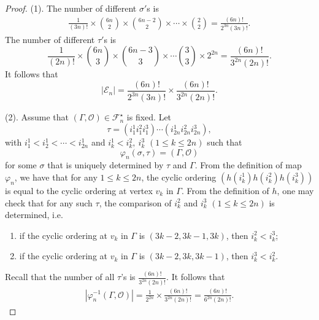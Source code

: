 \documentclass{amsart}
\theoremstyle{plain}
\theoremstyle{definition}
\theoremstyle{remark}
\begin{document}
\begin{proof}
(1). The number of different $\sigma'$s is
\begin{align*}
    \frac{1}{(3n)!}\times\binom{6n}{2}\times\binom{6n-2}{2}\times\cdots\times\binom{2}{2}=\frac{(6n)!}{2^{3n}(3n)!}.
\end{align*}
The number of different $\tau'$s is
$$\frac{1}{(2n)!}\times\binom{6n}{3}\times\binom{6n-3}{3}\times\cdots\binom{3}{3}\times 2^{2n}=\frac{(6n)!}{3^{2n}(2n)!}.$$
It follows that 
$$|\mathcal{E}_n|=\frac{(6n)!}{2^{3n}(3n)!}\times \frac{(6n)!}{3^{2n} (2n)!}.$$

(2). Assume that $(\Gamma,\mathcal{O})\in\mathcal{F}_n^\star$ is fixed. Let 
$$\tau=\left(i_1^1i_1^2i_1^3\right)\cdots\left(i_{2n}^1i_{2n}^2i_{2n}^3\right),$$
with $i_1^1<i_2^1<\cdots<i_{2n}^1$ and $i_k^1<i_k^2,\ i_k^3$ $(1\leq k\leq 2n)$ such that 
$$\varphi_n(\sigma,\tau)=(\Gamma,\mathcal{O})$$
for some $\sigma$ that is uniquely determined by $\tau$ and $\Gamma$. From the definition of map $\varphi_n$, we have that for any $1\leq k\leq 2n$, the cyclic ordering $\left(h(i_k^1)h(i_k^2)h(i_k^3)\right)$ is equal to the cyclic ordering at vertex $v_k$ in $\Gamma$. From the definition of $h$, one may check that for any such $\tau$, the comparison of $i_k^2$ and $i_k^3$ $(1\leq k\leq 2n)$ is determined, i.e.
\begin{enumerate}
    \item if the cyclic ordering at $v_k$ in $\Gamma$ is $(3k-2,3k-1,3k)$, then $i_k^2<i_k^3$;
    \item if the cyclic ordering at $v_k$ in $\Gamma$ is $(3k-2,3k,3k-1)$, then $i_k^3<i_k^2$.
\end{enumerate}
Recall that the number of all $\tau$'s is $ \frac{(6n)!}{3^{2n}(2n)!}$. It follows that 
\begin{align*}
\left|\varphi_n^{-1}(\Gamma,\mathcal{O})\right|= \frac{1}{2^{2n}} \times \frac{(6n)!}{3^{2n}(2n)!}
=\frac{(6n)!}{6^{2n}(2n)!}.
\end{align*}


\end{proof}
\end{document}

